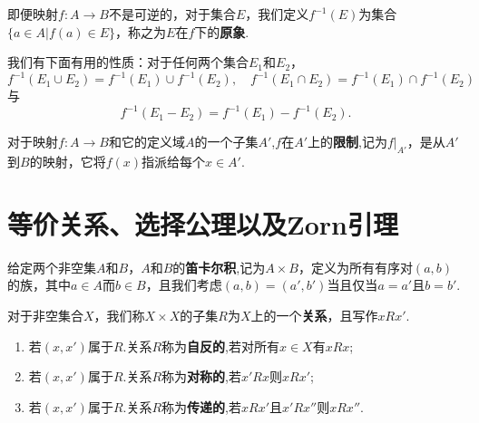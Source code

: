 \documentclass[lang=cn,newtx,10pt,scheme=chinese]{elegantbook}
\begin{document}
\begin{definition}[原象]\label{definition:原象的定义}
  即便映射\(f:A\to B\)不是可逆的，对于集合\(E\)，我们定义\(f^{-1}(E)\)为集合\(\{a\in A|f(a)\in E\}\)，称之为\(E\)在\(f\)下的\textbf{原象}.
\end{definition}

\begin{proposition}[原像的性质]\label{proposition:原像的性质}
  我们有下面有用的性质：对于任何两个集合\(E_1\)和\(E_2\)，
\[
f^{-1}(E_1\cup E_2)=f^{-1}(E_1)\cup f^{-1}(E_2),\quad f^{-1}(E_1\cap E_2)=f^{-1}(E_1)\cap f^{-1}(E_2)
\]
与
\[
f^{-1}(E_1- E_2)=f^{-1}(E_1)- f^{-1}(E_2).
\]
\end{proposition}

\begin{definition}[映射的限制]\label{definition:映射的限制}
  对于映射\(f:A\to B\)和它的定义域\(A\)的一个子集\(A'\),\(f\)在\(A'\)上的\textbf{限制},记为\(f|_{A'}\)，是从\(A'\)到\(B\)的映射，它将\(f(x)\)指派给每个\(x\in A'\).
\end{definition}



\section{等价关系、选择公理以及Zorn引理}

\begin{definition}[笛卡尔积]\label{}
  给定两个非空集\(A\)和\(B\)，\(A\)和\(B\)的\textbf{笛卡尔积},记为\(A\times B\)，定义为所有有序对\((a, b)\)的族，其中\(a\in A\)而\(b\in B\)，且我们考虑\((a, b)=(a', b')\)当且仅当\(a = a'\)且\(b = b'\).
\end{definition}

\begin{definition}\label{definition:关系及其自反性、对称性、传递性}
  对于非空集合\(X\)，我们称\(X\times X\)的子集\(R\)为\(X\)上的一个\textbf{关系}，且写作\(xRx'\).
  \begin{enumerate}
    \item 若\((x, x')\)属于\(R\).关系\(R\)称为\textbf{自反的},若对所有\(x\in X\)有\(xRx\);

    \item 若\((x, x')\)属于\(R\).关系\(R\)称为\textbf{对称的},若\(x'Rx\)则\(xRx'\);
    
    \item 若\((x, x')\)属于\(R\).关系\(R\)称为\textbf{传递的},若\(xRx'\)且\(x'Rx''\)则\(xRx''\).  
  \end{enumerate}
\end{definition}
\end{document}
